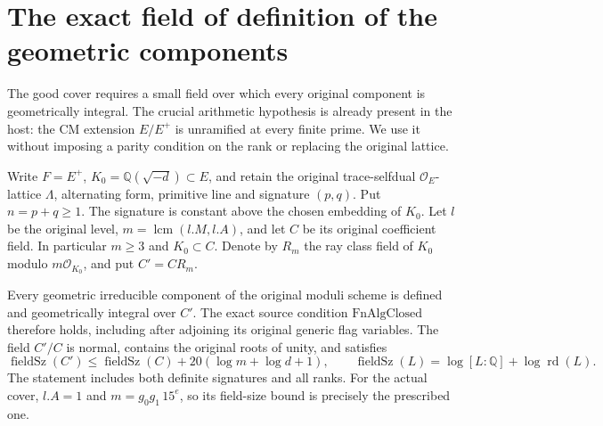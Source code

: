 \section{The exact field of definition of the geometric components}
\label{sec:actual-component-field}

The good cover requires a small field over which every original
component is geometrically integral.  The crucial arithmetic hypothesis
is already present in the host: the CM extension $E/E^+$ is unramified
at every finite prime.  We use it without imposing a parity condition
on the rank or replacing the original lattice.

Write $F=E^+$, $K_0=\mathbb Q(\sqrt{-d})\subset E$, and retain the
original trace-selfdual $\mathcal O_E$-lattice $\Lambda$, alternating
form, primitive line and signature $(p,q)$.  Put $n=p+q\geq1$.
The signature is constant above the chosen embedding of $K_0$.
Let $l$ be the original level, $m=\operatorname{lcm}(l.M,l.A)$,
and let $C$ be its original coefficient field.  In particular
$m\geq3$ and $K_0\subset C$.  Denote by $R_m$ the ray class field
of $K_0$ modulo $m\mathcal O_{K_0}$, and put $C'=CR_m$.

\begin{theorem}
\label{thm:actual-component-field}
Every geometric irreducible component of the original moduli scheme
is defined and geometrically integral over $C'$.  The exact source
condition $\mathrm{FnAlgClosed}$ therefore holds, including after
adjoining its original generic flag variables.  The field $C'/C$ is
normal, contains the original roots of unity, and satisfies
\[
 \operatorname{fieldSz}(C')\leq\operatorname{fieldSz}(C)
                  +20(\log m+\log d+1),
 \qquad
 \operatorname{fieldSz}(L)=\log[L:\mathbb Q]+\log\operatorname{rd}(L).
\]
The statement includes both definite signatures and all ranks.
For the actual cover, $l.A=1$ and $m=g_0g_1\,15^e$, so its
field-size bound is precisely the prescribed one.
\end{theorem}

